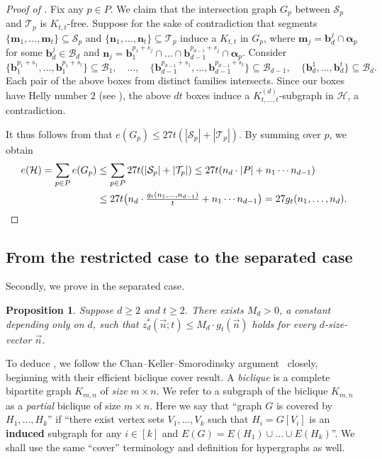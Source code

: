 \documentclass[11pt]{article}
\newtheorem{proposition}[theorem]{Proposition}
\theoremstyle{definition}
\newcommand*{\cH}{\mathcal{H}}
\newcommand*{\cB}{\mathcal{B}}
\newcommand*{\cS}{\mathcal{S}}
\newcommand*{\cT}{\mathcal{T}}
\newcommand*{\vn}{\vec{n}}
\begin{document}
\begin{proof}[Proof of ]
    Fix any $p \in P$. We claim that the intersection graph $G_p$ between $\cS_p$ and $\cT_p$ is $K_{t, t}$-free. Suppose for the sake of contradiction that segments $\{\bm{m}_1, \dots, \bm{m}_t\} \subseteq \cS_p$ and $\{\bm{n}_1, \dots, \bm{n}_t\} \subseteq \cT_p$ induce a $K_{t, t}$ in $G_p$, where $\bm{m}_j = \bm{b}_d^j \cap \bm{\alpha}_p$ for some $\bm{b}_d^j \in \cB_d$ and $\bm{n}_j = \bm{b}_1^{p_1+s_j} \cap \dots \cap \bm{b}_{d-1}^{p_{d-1}+s_j} \cap \bm{\alpha}_p$. Consider
    \[
    \bigl\{ \bm{b}_1^{p_1+s_1}, \dots, \bm{b}_1^{p_1+s_t} \bigr\} \subseteq \cB_1, \quad \dots, \quad \bigl\{ \bm{b}_{d-1}^{p_{d-1}+s_1}, \dots, \bm{b}_{d-1}^{p_{d-1}+s_t} \bigr\} \subseteq \cB_{d-1}, \quad \bigl\{ \bm{b}_d^1, \dots, \bm{b}_d^t \bigr\} \subseteq \cB_d. 
    \]
    Each pair of the above boxes from distinct families intersects. Since our boxes have Helly number $2$ (see ), the above $dt$ boxes induce a $K_{t, \dots, t}^{(d)}$-subgraph in $\cH$, a contradiction. 
    
    It thus follows from  that $e(G_p) \le 27t(|\cS_p| + |\cT_p|)$. By summing over $p$, we obtain
    \begin{align*}
        e(\cH) = \sum_{p \in P} e(G_p) &\le \sum_{p \in P} 27t(|\cS_p| + |\cT_p|) \le 27t( n_d \cdot |P| + n_1 \cdots n_{d-1} ) \\
        &\le 27t \bigl( n_d \cdot \tfrac{g_t(n_1, \dots, n_{d-1})}{t} + n_1 \cdots n_{d-1} \bigr) = 27g_t(n_1, \dots, n_d). \qedhere
    \end{align*}
\end{proof}



\subsection{From the restricted case to the separated case} \label{sec:upper_separated}

Secondly, we prove  in the separated case. 

\begin{proposition} \label{prop:upper_separated}
    Suppose $d \ge 2$ and $t \ge 2$. There exists $M_d > 0$, a constant depending only on $d$, such that $z_d^*(\vn; t) \le M_d \cdot g_t(\vn)$ holds for every $d$-size-vector $\vn$. 
\end{proposition}

To deduce , we follow the Chan--Keller--Smorodinsky argument~\cite[Section 2.2.2]{chan_keller_smorodinsky} closely, beginning with their efficient biclique cover result. A \emph{biclique} is a complete bipartite graph $K_{m, n}$ of \emph{size} $m \times n$. We refer to a subgraph of the biclique $K_{m, n}$ as a \emph{partial} biclique of size $m \times n$. Here we say that ``graph $G$ is covered by $H_1, \dots, H_k$'' if ``there exist vertex sets $V_1, \dots, V_k$ such that $H_i = G[V_i]$ is an \textbf{induced} subgraph for any $i \in [k]$ and $E(G) = E(H_1) \cup \dots \cup E(H_k)$''. We shall use the same ``cover'' terminology and definition for hypergraphs as well. 
\end{document}
